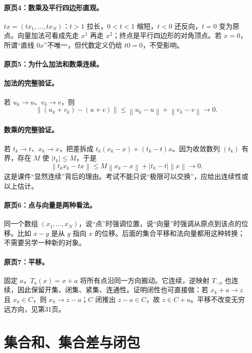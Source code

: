 \documentclass[11pt,a4paper]{article}
\newcommand{\norm}[1]{\left\lVert#1\right\rVert}
\theoremstyle{definition}\newtheorem{definition}{定义}\newtheorem{example}{例}
\begin{document}
\paragraph{原页4：数乘及平行四边形直观。}$t x=(t x_1,\ldots,t x_N)$：$t>1$ 拉长，$0<t<1$ 缩短，$t<0$ 还反向，$t=0$ 变为原点。向量加法可看成先走 $x^1$ 再走 $x^2$；终点是平行四边形的对角顶点。若 $x=0$，所谓“直线 $0x$”不唯一，但代数定义仍给 $t0=0$，不受影响。



\paragraph{原页5：为什么加法和数乘连续。}\paragraph{加法的完整验证。} 若 $u_k\to u$、$v_k\to v$，则
\[\norm{(u_k+v_k)-(u+v)}\le\norm{u_k-u}+\norm{v_k-v}\longrightarrow0.\]
\paragraph{数乘的完整验证。} 若 $t_k\to t$、$x_k\to x$，把差拆成 $t_k(x_k-x)+(t_k-t)x$。因为收敛数列 $(t_k)$ 有界，存在 $M$ 使 $|t_k|\le M$，于是
\[\norm{t_kx_k-tx}\le M\norm{x_k-x}+|t_k-t|\norm x\longrightarrow0.\]
这是课件“显然连续”背后的理由。考试不能只说“极限可以交换”，应给出连续性或以上估计。



\paragraph{原页6：点与向量是两种看法。}同一个数组 $(x_1,\ldots,x_N)$，说“点”时强调位置，说“向量”时强调从原点到该点的位移。比如 $x-y$ 是从 $y$ 指向 $x$ 的位移。后面的集合平移和法向量都用这种转换；不需要另学一种新的对象。



\paragraph{原页7：平移。}固定 $a$，$T_a(x)=x+a$ 将所有点沿同一方向搬动。它连续，逆映射 $T_{-a}$ 也连续，因此保留开集、闭集、紧集、连通性。证明闭性也可直接做：若 $x_k+a\to z$ 且 $x_k\in C$，则 $x_k\to z-a$；$C$ 闭推出 $z-a\in C$，故 $z\in C+a$。平移不改变无穷远方向，见第31页。



\clearpage\section{集合和、集合差与闭包}\label{g:109:8}
\end{document}
